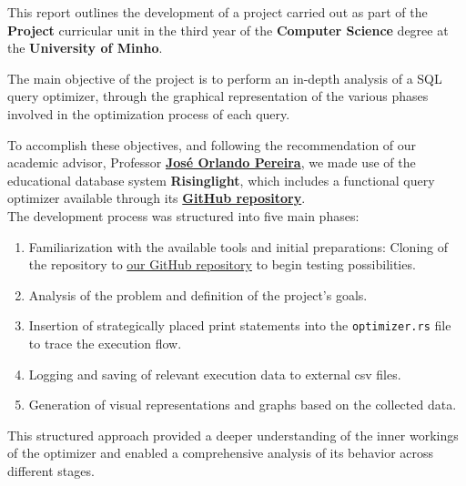\documentclass[a4paper,12pt]{scrreprt}
\begin{document}

\makecover 
{}


\renewenvironment{abstract}
 {\par\noindent\textbf{\Large\abstractname}\par\bigskip}
 {}

\begin{abstract}
This report outlines the development of a project carried out as part of the \textbf{Project} curricular unit in the third year of the \textbf{Computer Science} degree at the \textbf{University of Minho}. 

The main objective of the project is to perform an in-depth analysis of a SQL query optimizer, through the graphical representation of the various phases involved in the optimization process of each query. 

To accomplish these objectives, and following the recommendation of our academic advisor, Professor \textbf{\href{https://jopereira.github.io}{José Orlando Pereira}}, we made use of the educational database system \textbf{Risinglight}, which includes a functional query optimizer available through its \textbf{\href{https://github.com/risinglightdb/risinglight}{GitHub repository}}. \\

The development process was structured into five main phases:
\begin{enumerate}
    \item Familiarization with the available tools and initial preparations: Cloning of the repository to \href{https://github.com/Blackparkd/risinglight}{our GitHub repository} to begin testing possibilities.
    \item Analysis of the problem and definition of the project's goals.
    \item Insertion of strategically placed print statements into the \texttt{optimizer.rs} file to trace the execution flow.
    \item Logging and saving of relevant execution data to external csv files.
    \item Generation of visual representations and graphs based on the collected data.
\end{enumerate}

This structured approach provided a deeper understanding of the inner workings of the optimizer and enabled a comprehensive analysis of its behavior across different stages.
\end{abstract}
\end{document}
